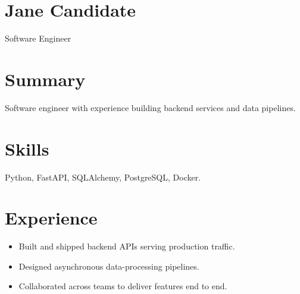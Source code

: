\documentclass{article}
\begin{document}
\section*{Jane Candidate}
Software Engineer

\section*{Summary}
Software engineer with experience building backend services and data pipelines.

\section*{Skills}
Python, FastAPI, SQLAlchemy, PostgreSQL, Docker.

\section*{Experience}
\begin{itemize}
  \item Built and shipped backend APIs serving production traffic.
  \item Designed asynchronous data-processing pipelines.
  \item Collaborated across teams to deliver features end to end.
\end{itemize}
\end{document}
